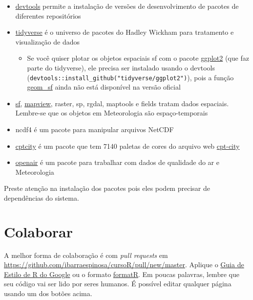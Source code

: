 \documentclass[]{book}
\providecommand{\tightlist}{%
  \setlength{\itemsep}{0pt}\setlength{\parskip}{0pt}}
\begin{document}
\begin{itemize}
\tightlist
\item
  \href{https://CRAN.R-project.org/package=devtools}{devtools} permite a
  instalação de versões de desenvolvimento de pacotes de diferentes
  repositórios
\item
  \href{https://github.com/tidyverse}{tidyverse} é o universo de pacotes
  do Hadley Wickham para tratamento e visualização de dados

  \begin{itemize}
  \tightlist
  \item
    Se você quiser plotar os objetos espaciais sf com o pacote
    \href{http://ggplot2.tidyverse.org/}{ggplot2} (que faz parte do
    tidyverse), ele precisa ser instalado usando o devtools
    (\texttt{devtools::install\_github("tidyverse/ggplot2")}), pois a
    função \href{https://www.isgeomsfinggplot2yet.site/}{geom\_sf} ainda
    não está disponível na versão oficial
  \end{itemize}
\item
  \href{https://github.com/r-spatial/sf}{sf},
  \href{https://github.com/r-spatial/mapbiew}{mapview}, raster, sp,
  rgdal, maptools e fields tratam dados espaciais. Lembre-se que os
  objetos em Meteorologia são espaço-temporais
\item
  ncdf4 é um pacote para manipular arquivos NetCDF
\item
  \href{https://ibarraespinosa.github.io/cptcity/}{cptcity} é um pacote
  que tem 7140 paletas de cores do arquivo web
  \href{http://soliton.vm.bytemark.co.uk/pub/cpt-city/index.html}{cpt-city}
\item
  \href{http://davidcarslaw.github.io/openair/}{openair} é um pacote
  para trabalhar com dados de qualidade do ar e Meteorologia
\end{itemize}

Preste atenção na instalação dos pacotes pois eles podem precisar de
dependências do sistema.

\section{Colaborar}\label{colaborar}

A melhor forma de colaboração é com \emph{pull requests} em
\url{https://github.com/ibarraespinosa/cursoR/pull/new/master}. Aplique
o \href{https://google.github.io/styleguide/Rguide.xml}{Guia de Estilo
de R do Google} ou o formato
\href{https://yihui.name/formatr/}{formatR}. Em poucas palavras, lembre
que seu código vai ser lido por seres humanos. É possível editar
qualquer página usando um dos botões acima.
\end{document}
